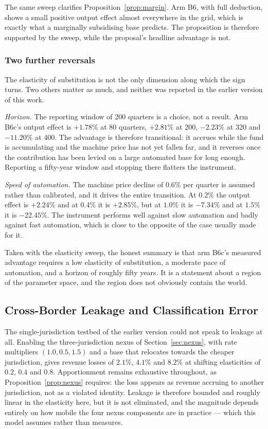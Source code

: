 \documentclass[journal]{IEEEtran}
\theoremstyle{plain}
\theoremstyle{definition}
\begin{document}
The same sweep clarifies Proposition~\ref{prop:margin}. Arm B6, with full
deduction, shows a small positive output effect almost everywhere in the grid,
which is exactly what a marginally subsidising base predicts. The proposition is
therefore supported by the sweep, while the proposal's headline advantage is
not.



\subsubsection{Two further reversals}

The elasticity of substitution is not the only dimension along which the sign
turns. Two others matter as much, and neither was reported in the earlier
version of this work.

\emph{Horizon.} The reporting window of 200 quarters is a choice, not a result.
Arm B6c's output effect is $+1.78\%$ at 80 quarters, $+2.81\%$ at 200,
$-2.23\%$ at 320 and $-11.20\%$ at 400. The advantage is therefore transitional:
it accrues while the fund is accumulating and the machine price has not yet
fallen far, and it reverses once the contribution has been levied on a large
automated base for long enough. Reporting a fifty-year window and stopping
there flatters the instrument.

\emph{Speed of automation.} The machine price decline of $0.6\%$ per quarter is
assumed rather than calibrated, and it drives the entire transition. At
$0.2\%$ the output effect is $+2.24\%$ and at $0.4\%$ it is $+2.85\%$, but at
$1.0\%$ it is $-7.34\%$ and at $1.5\%$ it is $-22.45\%$. The instrument
performs well against slow automation and badly against fast automation, which
is close to the opposite of the case usually made for it.

Taken with the elasticity sweep, the honest summary is that arm B6c's measured
advantage requires a low elasticity of substitution, a moderate pace of
automation, and a horizon of roughly fifty years. It is a statement about a
region of the parameter space, and the region does not obviously contain the
world.

\subsection{Cross-Border Leakage and Classification Error}
\label{sec:leakage}

The single-jurisdiction testbed of the earlier version could not speak to
leakage at all. Enabling the three-jurisdiction nexus of
Section~\ref{sec:nexus}, with rate multipliers $(1.0, 0.5, 1.5)$ and a base
that relocates towards the cheaper jurisdiction, gives revenue losses of
$2.1\%$, $4.1\%$ and $8.2\%$ at shifting elasticities of $0.2$, $0.4$ and
$0.8$. Apportionment remains exhaustive throughout, as
Proposition~\ref{prop:nexus} requires: the loss appears as revenue accruing to
another jurisdiction, not as a violated identity. Leakage is therefore bounded
and roughly linear in the elasticity here, but it is not eliminated, and the
magnitude depends entirely on how mobile the four nexus components are in
practice --- which this model assumes rather than measures.
\end{document}
